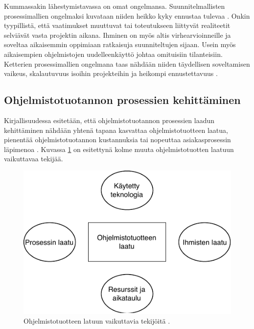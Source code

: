 \documentclass[finnish,12pt,a4paper,pdftex]{article}
\begin{document}
\noindent Kummassakin lähestymistavassa on omat ongelmansa. Suunnitelmallisten prosessimallien ongelmaksi kuvataan niiden heikko kyky ennustaa tulevaa \citep{ohjelmistotuotanto}. Onkin tyypillistä, että vaatimukset muuttuvat tai toteutukseen liittyvät realiteetit selviävät vasta projektin aikana. Ihminen on myös altis virhearvioinneille ja soveltaa aikaisemmin oppimiaan ratkaisuja suunniteltujen sijaan. Usein myös aikaisempien ohjelmistojen uudelleenkäyttö johtaa omituisiin tilanteisiin. Ketterien prosessimallien ongelmana taas nähdään niiden täydellisen soveltamisen vaikeus, skalautuvuus isoihin projekteihin ja heikompi ennustettavuus \citep{okaytannot}.\\

\subsection{Ohjelmistotuotannon prosessien kehittäminen}

Kirjallisuudessa esitetään, että ohjelmistotuotannon prosessien laadun kehittäminen nähdään yhtenä tapana kasvattaa ohjelmistotuotteen laatua, pienentää ohjelmistotuotannon kustannuksia tai nopeuttaa asiakasprosessin läpimenoa \citep{sommerville}. Kuvassa \ref{fig:ohjlaatu} on esitettynä kolme muuta ohjelmistotuotten laatuun vaikuttavaa tekijää. \\

\begin{figure}[!h]
    \centering
    \includegraphics[scale=0.8]{images/ohjelmistonlaatu.pdf}
    \caption{Ohjelmistotuotteen latuun vaikuttavia tekijöitä \citep{sommerville}.}
    \label{fig:ohjlaatu}
\end{figure}
\end{document}
